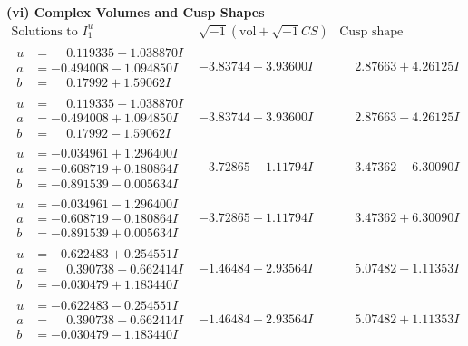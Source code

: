 \documentclass[1p]{elsarticle_modified}
\theoremstyle{definition}
\newcommand{\I}{\sqrt{-1}}
\begin{document}
\newpage\flushleft \textbf{(vi) Complex Volumes and Cusp Shapes}
$$\begin{array}{c|c|c}  
\text{Solutions to }I^u_{1}& \I (\text{vol} + \sqrt{-1}CS) & \text{Cusp shape}\\
 \hline 
\begin{aligned}
u &= \phantom{-}0.119335 + 1.038870 I \\
a &= -0.494008 - 1.094850 I \\
b &= \phantom{-}0.17992 + 1.59062 I\end{aligned}
 & -3.83744 - 3.93600 I & \phantom{-}2.87663 + 4.26125 I \\ \hline\begin{aligned}
u &= \phantom{-}0.119335 - 1.038870 I \\
a &= -0.494008 + 1.094850 I \\
b &= \phantom{-}0.17992 - 1.59062 I\end{aligned}
 & -3.83744 + 3.93600 I & \phantom{-}2.87663 - 4.26125 I \\ \hline\begin{aligned}
u &= -0.034961 + 1.296400 I \\
a &= -0.608719 + 0.180864 I \\
b &= -0.891539 - 0.005634 I\end{aligned}
 & -3.72865 + 1.11794 I & \phantom{-}3.47362 - 6.30090 I \\ \hline\begin{aligned}
u &= -0.034961 - 1.296400 I \\
a &= -0.608719 - 0.180864 I \\
b &= -0.891539 + 0.005634 I\end{aligned}
 & -3.72865 - 1.11794 I & \phantom{-}3.47362 + 6.30090 I \\ \hline\begin{aligned}
u &= -0.622483 + 0.254551 I \\
a &= \phantom{-}0.390738 + 0.662414 I \\
b &= -0.030479 + 1.183440 I\end{aligned}
 & -1.46484 + 2.93564 I & \phantom{-}5.07482 - 1.11353 I \\ \hline\begin{aligned}
u &= -0.622483 - 0.254551 I \\
a &= \phantom{-}0.390738 - 0.662414 I \\
b &= -0.030479 - 1.183440 I\end{aligned}
 & -1.46484 - 2.93564 I & \phantom{-}5.07482 + 1.11353 I \\ \hline\begin{aligned}

\end{aligned}
\end{array}$$
\end{document}
